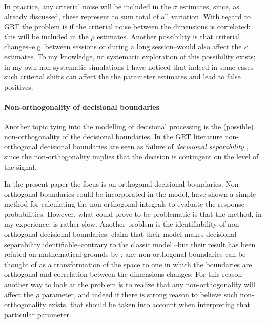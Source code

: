 \documentclass{article}\usepackage{knitr}
\begin{document}
In practice, any criterial noise will be included in the $\sigma$ estimates, since, as already discussed, these represent to sum total of all variation. With regard to GRT the problem is if the criterial noise between the dimensions is correlated: this will be included in the $\rho$ estimates. Another possibility is that criterial changes--e.g. between sessions or during a long session--would also affect the $\kappa$ estimates. To my knowledge, no systematic exploration of this possibility exists; in my own non-systematic simulations I have noticed that indeed in some cases such criterial shifts can affect the the parameter estimates and lead to false positives. 

\paragraph{Non-orthogonality of decisional boundaries}

Another topic tying into the modelling of decisional processing is the (possible) non-orthogonality of the decisional boundaries. In the GRT literature non-orthogonal decisional boundaries are seen as failure of \textit{decisional separability} \citep{ashby2015}, since the non-orthogonality implies that the decision is contingent on the level of the signal. 

In the present paper the focus is on orthogonal decisional boundaries. Non-orthogonal boundaries could be incorporated in the model, \cite{ennis2003} have shown a simple method for calculating the non-orthogonal integrals to evaluate the response probabilities. However, what could prove to be problematic is that the method, in my experience, is rather slow.  Another problem is the identifiability of non-orthogonal decisional boundaries: \cite{soto2015} claim that their model makes decisional separability identifiable--contrary to the classic model \citep{silbert2013}--but their result has been refuted on mathematical grounds by \cite{silbert2016}: any non-orthogonal boundaries can be thought of as a transformation of the space to one in which the boundaries are orthogonal and correlation between the dimensions changes. For this reason another way to look at the problem is to realize that any non-orthogonality will affect the $\rho$ parameter, and indeed if there is strong reason to believe such non-orthogonality exists, that should be taken into account when interpreting that particular parameter.  

\newpage

\end{document}
